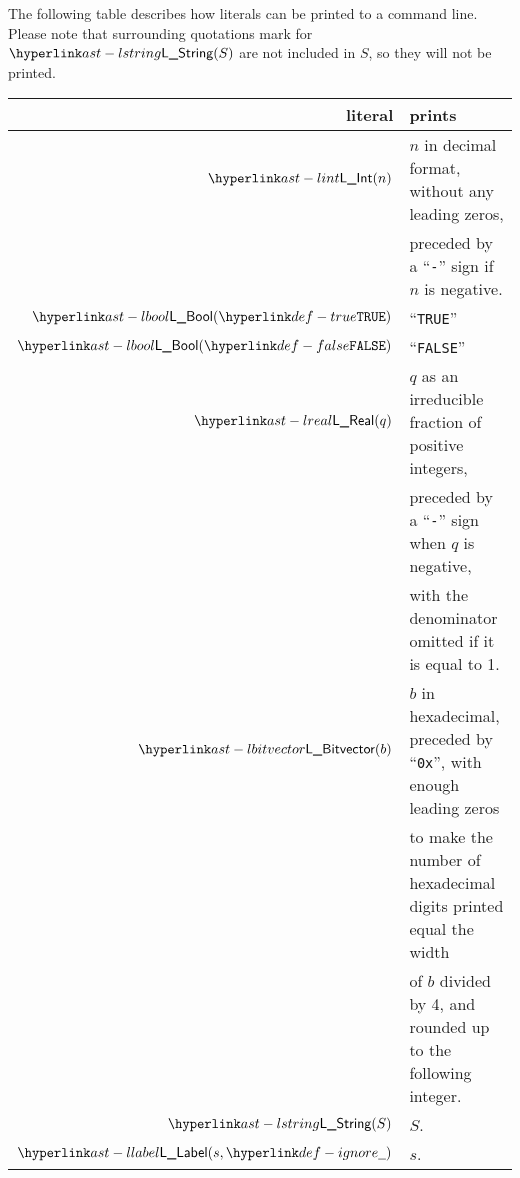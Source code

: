The following table describes how literals can be printed to a command line.
%
Please note that surrounding quotations mark for $\lstring(S)$ are not included
in $S$, so they will not be printed.

\begin{tabular}{rl}
  \textbf{literal} & \textbf{prints} \\
  \hline
  $\lint(n)$ & $n$ in decimal format, without any leading zeros, \\
             & preceded by a ``\texttt{-}'' sign if $n$ is negative. \\
  $\lbool(\True)$ & ``\texttt{TRUE}'' \\
  $\lbool(\False)$ & ``\texttt{FALSE}'' \\
  $\lreal(q)$ & $q$ as an irreducible fraction of positive integers, \\
              & preceded by a ``\texttt{-}'' sign when $q$ is negative, \\
              & with the denominator omitted if it is equal to 1. \\
  $\lbitvector(b)$ & $b$ in hexadecimal, preceded by ``\texttt{0x}'', with enough leading zeros \\
                   & to make the number of hexadecimal digits printed equal the width \\ 
                   & of $b$ divided by 4, and rounded up to the following integer. \\
  $\lstring(S)$ & $S$. \\
  $\llabel(s, \Ignore)$ & $s$. \\
\end{tabular}

